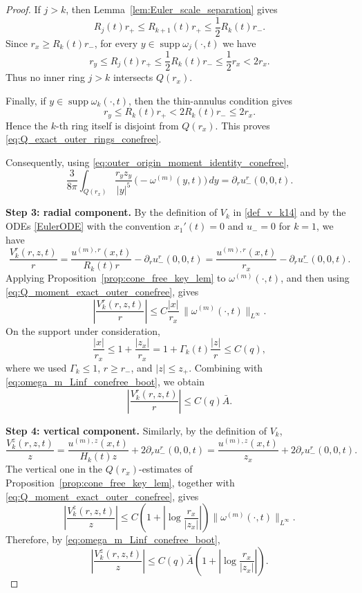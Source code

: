 \documentclass[reqno,11pt]{amsart}
\newcommand{\supp}{\operatorname{supp}}
\begin{document}
\begin{proof}
If \(j>k\), then Lemma~\ref{lem:Euler_scale_separation} gives
\[
R_j(t)r_+\le R_{k+1}(t)r_+\le \frac12 R_k(t)r_-.
\]
Since \(r_x\ge R_k(t)r_-\), for every \(y\in\supp\omega_j(\cdot,t)\) we have
\[
r_y\le R_j(t)r_+
\le \frac12 R_k(t)r_-
\le \frac12 r_x
<2r_x.
\]
Thus no inner ring \(j>k\) intersects \(Q(r_x)\).

Finally, if \(y\in\supp\omega_k(\cdot,t)\), then the thin-annulus condition gives
\[
r_y\le R_k(t)r_+
<2R_k(t)r_-
\le 2r_x.
\]
Hence the \(k\)-th ring itself is disjoint from \(Q(r_x)\). This proves
\eqref{eq:Q_exact_outer_rings_conefree}.

Consequently, using \eqref{eq:outer_origin_moment_identity_conefree},
\begin{equation}
\label{eq:Q_moment_exact_outer_conefree}
\frac{3}{8\pi}
\int_{Q(r_x)}
\frac{r_yz_y}{|y|^5}\, \big(-\omega^{(m)}(y,t) \big)\,dy
=
\partial_r u_-^r(0,0,t).
\end{equation}

\medskip
\noindent\textbf{Step 3: radial component.}
By the definition of \(V_k\) in \eqref{def_v_k14} and by the ODEs \eqref{EulerODE}
with the convention \(x_1'(t)=0\) and \(u_-=0\) for \(k=1\), we have
\[
\frac{V_k^r(r,z,t)}{r}
=
\frac{u^{(m),r}(x,t)}{R_k(t)r}
-
\partial_r u_-^r(0,0,t)
=
\frac{u^{(m),r}(x,t)}{r_x}
-
\partial_r u_-^r(0,0,t).
\]
Applying Proposition~\ref{prop:cone_free_key_lem} to \(\omega^{(m)}(\cdot,t)\), and then
using \eqref{eq:Q_moment_exact_outer_conefree}, gives
\[
\left|
\frac{V_k^r(r,z,t)}{r}
\right|
\le
C\frac{|x|}{r_x}\,
\|\omega^{(m)}(\cdot,t)\|_{L^\infty}.
\]
On the support under consideration,
\[
\frac{|x|}{r_x}
\le
1+\frac{|z_x|}{r_x}
=
1+\Gamma_k(t)\frac{|z|}{r}
\le C(q),
\]
where we used $\Gamma_k \leq 1$, \(r\ge r_-\), and
\(|z|\le z_+\). Combining with \eqref{eq:omega_m_Linf_conefree_boot}, we obtain
\begin{equation}
\label{eq:Vk_radial_conefree_bound_no_remainder}
\left|
\frac{V_k^r(r,z,t)}{r}
\right|
\le C(q)\bar A.
\end{equation}

\medskip
\noindent\textbf{Step 4: vertical component.}
Similarly, by the definition of \(V_k\),
\[
\frac{V_k^z(r,z,t)}{z}
=
\frac{u^{(m),z}(x,t)}{H_k(t)z}
+
2\partial_r u_-^r(0,0,t)
=
\frac{u^{(m),z}(x,t)}{z_x}
+
2\partial_r u_-^r(0,0,t).
\]
The vertical one in the $Q(r_x)$-estimates of Proposition~\ref{prop:cone_free_key_lem}, together with
\eqref{eq:Q_moment_exact_outer_conefree}, gives
\[
\left|
\frac{V_k^z(r,z,t)}{z}
\right|
\le
C\left(1+\left|\log\frac{r_x}{|z_x|}\right|\right)
\|\omega^{(m)}(\cdot,t)\|_{L^\infty}.
\]
Therefore, by \eqref{eq:omega_m_Linf_conefree_boot},
\begin{equation}
\label{eq:Vk_vertical_conefree_prelog_no_remainder}
\left|
\frac{V_k^z(r,z,t)}{z}
\right|
\le
C(q)\bar A
\left(1+\left|\log\frac{r_x}{|z_x|}\right|\right).
\end{equation}


\end{proof}
\end{document}
